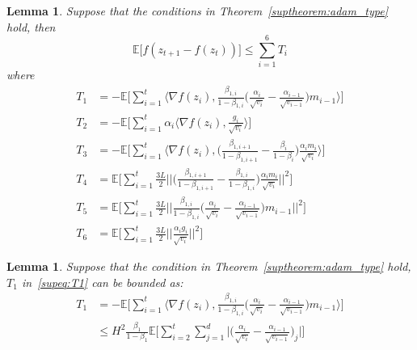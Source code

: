 \documentclass{article}
\newtheorem{lemma}[theorem]{Lemma}
\begin{document}
\begin{lemma}
\cite{chen2018convergence}
\label{suplemma:6.2}
Suppose that the conditions in Theorem~\eqref{suptheorem:adam_type} hold, then 
\begin{equation}
    \mathbb{E}\Big[ f(z_{t+1} - f(z_t)) \Big] \leq \sum_{i=1}^6 T_i
\end{equation}
where
\begin{align}
T_1 &= - \mathbb{E}\Big[ \sum_{i=1}^t \langle \nabla f(z_i), \frac{\beta_{1,i}}{1-\beta_{1,i}} \Big( \frac{\alpha_i}{\sqrt{v_i}} - \frac{\alpha_{i-1}}{\sqrt{v_{i-1}}} \Big) m_{i-1} \rangle \Big] \label{supeq:T1} \\
T_2 &= - \mathbb{E} \Big[ \sum_{i=1}^t \alpha_i \langle \nabla f(z_i), \frac{g_i}{\sqrt{v_i}} \rangle \Big] \label{supeq:T2} \\
T_3 &= - \mathbb{E} \Big[ \sum_{i=1}^t \langle \nabla f(z_i), \Big( \frac{\beta_{1,i+1}}{1 - \beta_{1,i+1}} - \frac{\beta_i}{1-\beta_i} \Big) \frac{\alpha_i m_i}{\sqrt{v_i}} \rangle  \Big] \label{supeq:T3}  \\
T_4 &= \mathbb{E} \Big[ \sum_{i=1}^t \frac{3L}{2} \Big \vert \Big \vert \Big( \frac{\beta_{1,i+1}}{1-\beta_{1,i+1}} - \frac{\beta_{1,i}}{1-\beta_{1,i}} \Big) \frac{\alpha_i m_i}{ \sqrt{v_i}} \Big \vert \Big \vert^2 \Big] \label{supeq:T4} \\
T_5 &= \mathbb{E} \Big[ \sum_{i=1}^t \frac{3L}{2} \Big \vert \Big \vert \frac{\beta_{1,i}}{1-\beta_{1,i}} \Big( \frac{\alpha_i}{\sqrt{v_i}} - \frac{\alpha_{i-1}}{\sqrt{v_{i-1}}} \Big)m_{i-1} \Big \vert \Big \vert^2  \Big]  \label{supeq:T5} \\
T_6 &= \mathbb{E} \Big[ \sum_{i=1}^t \frac{3L}{2} \Big \vert \Big \vert \frac{\alpha_i g_i}{\sqrt{v_i}} \Big \vert \Big \vert^2 \Big] \label{supeq:T6} 
\end{align}
\end{lemma}

\begin{lemma} \cite{chen2018convergence}
\label{suplemma:6.3}
Suppose that the condition in Theorem~\ref{suptheorem:adam_type} hold, $T_1$ in~\eqref{supeq:T1} can be bounded as:
\begin{align}
\label{supeq:T1_bound}
    T_1 &= - \mathbb{E}\Big[ \sum_{i=1}^t \langle \nabla f(z_i), \frac{\beta_{1,i}}{1-\beta_{1,i}} \Big( \frac{\alpha_i}{\sqrt{v_i}} - \frac{\alpha_{i-1}}{\sqrt{v_{i-1}}} \Big) m_{i-1} \rangle \Big] \nonumber \\
    & \leq H^2 \frac{\beta_1}{1-\beta_1} \mathbb{E} \Bigg[ \sum_{i=2}^t \sum_{j=1}^d \Big \vert \Big( \frac{\alpha_i}{\sqrt{v_i}} - \frac{\alpha_{i-1}}{\sqrt{v_{i-1}}} \Big)_j \Big \vert \Bigg]
\end{align}
\end{lemma}
\end{document}
